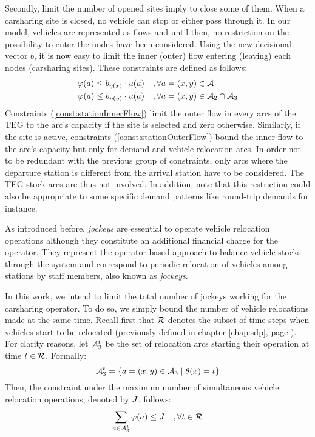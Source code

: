 \begin{bibunit}[ieeetr]
\medskip
Secondly, limit the number of opened sites imply to close some of them.
When a carsharing site is closed, no vehicle can stop or either pass through it.
In our model, vehicles are represented as flows and until then, no restriction on the possibility to enter the nodes have been considered.
Using the new decisional vector $b$, it is now easy to limit the inner (\resp outer) flow entering (\resp leaving) each nodes (carsharing sites).
These constraints are defined as follows:
\begin{align}
\varphi(a) \leq b_{\eta(x)} \cdot u(a) \quad & , \forall a = (x, y) \in \mathcal{A} \label{const:stationInnerFlow} \\
\varphi(a) \leq b_{\eta(y)} \cdot u(a) \quad & , \forall a = (x, y) \in \mathcal{A}_2 \cap \mathcal{A}_3 \label{const:stationOuterFlow}
\end{align}
Constraints (\ref{const:stationInnerFlow}) limit the outer flow in every arcs of the TEG to the arc's capacity if the site is selected and zero otherwise.
Similarly, if the site is active, constraints (\ref{const:stationOuterFlow}) bound the inner flow to the arc's capacity but only for demand and vehicle relocation arcs.
In order not to be redundant with the previous group of constraints, only arcs where the departure station is different from the arrival station have to be considered.
The TEG stock arcs are thus not involved.
In addition, note that this restriction could also be appropriate to some specific demand patterns like round-trip demands for instance.

\medskip
As introduced before, \emph{jockeys} are essential to operate vehicle relocation operations although they constitute an additional financial charge for the operator.
They represent the operator-based approach to balance vehicle stocks through the system and correspond to periodic relocation of vehicles among stations by staff members, also known as \emph{jockeys}.

In this work, we intend to limit the total number of jockeys working for the carsharing operator.
To do so, we simply bound the number of vehicle relocations made at the same time.
Recall first that $\mathcal{R}$ denotes the subset of time-steps when vehicles start to be relocated (previously defined in chapter \ref{chap:sdp}, page \pageref{def:relocTimeStepSet}).
For clarity reasons, let $\mathcal{A}_3^t$ be the set of relocation arcs starting their operation at time $t \in \mathcal{R}$.
Formally:
\begin{equation}
\mathcal{A}_3^t = \{a = (x, y) \in \mathcal{A}_3 \mid \theta(x) = t\}
\end{equation}
Then, the constraint under the maximum number of simultaneous vehicle relocation operations, denoted by $J$, follows:
\begin{equation} \label{const:nbJockeys}
\sum_{a \in \mathcal{A}_3^t} \varphi(a) \leq J \quad, \forall t \in \mathcal{R}
\end{equation}



\end{bibunit}
